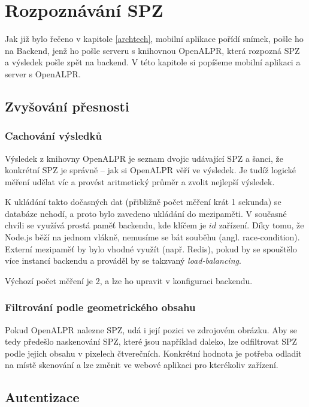 
\chapter{Rozpoznávání SPZ}

\noindent
Jak již bylo řečeno v kapitole \ref{archtech}, mobilní aplikace pořídí snímek,
pošle ho na Backend, jenž ho pošle serveru s knihovnou OpenALPR, která
rozpozná SPZ a výsledek pošle zpět na backend. V této kapitole si popíšeme
mobilní aplikaci a server s OpenALPR.

\section{Zvyšování přesnosti} \label{reco_params}

\subsection{Cachování výsledků}

\noindent
Výsledek z knihovny OpenALPR je seznam dvojic udávající SPZ a šanci, že konkrétní SPZ je správně --
jak si OpenALPR věří ve výsledek. Je tudíž logické měření udělat víc a provést aritmetický průměr a
zvolit nejlepší výsledek.

K ukládání takto dočasných dat (přibližně počet měření krát 1 sekunda) se databáze nehodí, a proto
bylo zavedeno ukládání do mezipaměti. V současné chvíli se využívá prostá paměť backendu,
kde klíčem je $id$ zařízení. Díky tomu, že Node.js běží na jednom vlákně, nemusíme se bát souběhu
(angl. race-condition). Externí mezipaměť by bylo vhodné využít (např. Redis), pokud by se spouštělo více
instancí backendu a prováděl by se takzvaný \textit{load-balancing}.

Výchozí počet měření je 2, a lze ho upravit v konfiguraci backendu.

\subsection{Filtrování podle geometrického obsahu}

\noindent
Pokud OpenALPR nalezne SPZ, udá i její pozici ve zdrojovém obrázku.
Aby se tedy předešlo naskenování SPZ, které jsou například daleko, lze odfiltrovat SPZ
podle jejich obsahu v pixelech čtverečních. Konkrétní hodnota je potřeba odladit na místě skenování a
lze změnit ve webové aplikaci pro kterékoliv zařízení.


\section{Autentizace}

